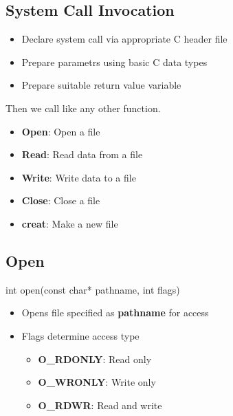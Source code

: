 \documentclass{report}
\begin{document}
    \subsection{System Call Invocation}
    \begin{itemize}
        \item Declare system call via appropriate C header file
        \item Prepare parametrs using basic C data types
        \item Prepare suitable return value variable
    \end{itemize}
    \bigbreak \noindent 
    Then we call like any other function.

    \pagebreak 
    \begin{itemize}
        \item \textbf{Open}: Open a file
        \item \textbf{Read}: Read data from a file
        \item \textbf{Write}: Write data to a file
        \item \textbf{Close}: Close a file
        \item \textbf{creat}:  Make a new file
    \end{itemize}
    \bigbreak \noindent 

    \bigbreak \noindent 
    \subsection{Open}
    \bigbreak \noindent 
    \begin{cppcode}
    int open(const char* pathname, int flags)
    \end{cppcode}
    \begin{itemize}
        \item Opens file specified as \textbf{pathname} for access
        \item Flags determine access type
            \begin{itemize}
                \item \textbf{O\_RDONLY}: Read only
                \item \textbf{O\_WRONLY}: Write only
                \item \textbf{O\_RDWR}: Read and write
            \end{itemize}
    \end{itemize}
    \bigbreak \noindent 
    \bigbreak \noindent 
\end{document}
